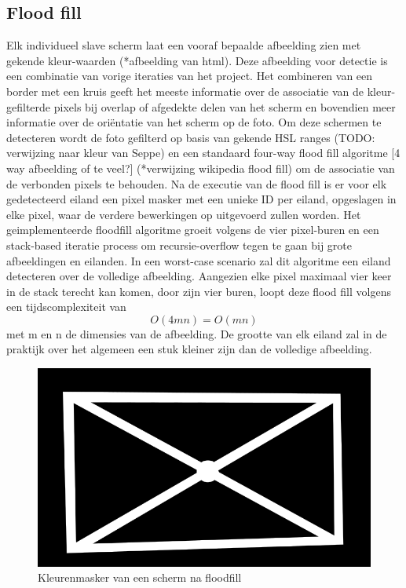 \subsection{Flood fill}
Elk individueel slave scherm laat een vooraf bepaalde afbeelding zien met gekende kleur-waarden (*afbeelding van html). Deze afbeelding voor detectie is een combinatie van vorige iteraties van het project. Het combineren van een border met een kruis geeft het meeste informatie over de associatie van de kleur-gefilterde pixels bij overlap of afgedekte delen van het scherm en bovendien meer informatie over de oriëntatie van het scherm op de foto. Om deze schermen te detecteren wordt de foto gefilterd op basis van gekende HSL ranges (TODO: verwijzing naar kleur van Seppe) en een standaard four-way flood fill algoritme [4 way afbeelding of te veel?] (*verwijzing wikipedia flood fill) om de associatie van de verbonden pixels te behouden. Na de executie van de flood fill is er voor elk gedetecteerd eiland een pixel masker met een unieke ID per eiland, opgeslagen in elke pixel, waar de verdere bewerkingen op uitgevoerd zullen worden. Het geimplementeerde floodfill algoritme groeit volgens de vier pixel-buren en een stack-based iteratie process om recursie-overflow tegen te gaan bij grote afbeeldingen en eilanden. In een worst-case scenario zal dit algoritme een eiland detecteren over de volledige afbeelding. Aangezien elke pixel maximaal vier keer in de stack terecht kan komen, door zijn vier buren, loopt deze flood fill volgens een tijdscomplexiteit van 
\[O(4mn)=O(mn)\]
 met m en n de dimensies van de afbeelding. De grootte van elk eiland zal in de praktijk over het algemeen een stuk kleiner zijn dan de volledige afbeelding.

\begin{figure}[h]
\centering
\includegraphics[scale=0.5]{img/mask.png}
\caption{Kleurenmasker van een scherm na floodfill}
\end{figure}

